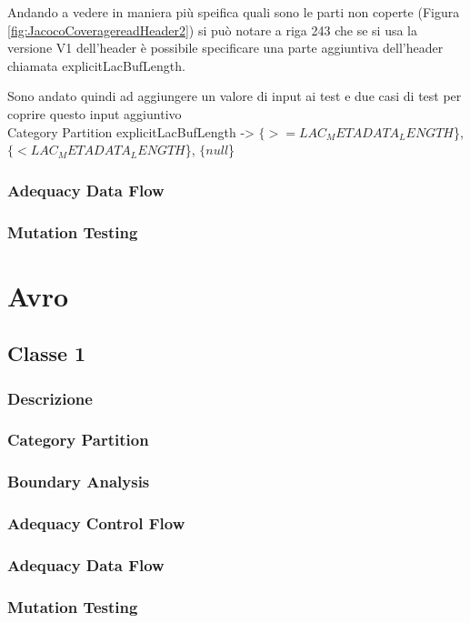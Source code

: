 \documentclass[12pt, a4paper]{article}
\begin{document}
Andando a vedere in maniera più speifica quali sono le parti non coperte (Figura \ref{fig:JacocoCoveragereadHeader2})
si può notare a riga 243 che se si usa la versione V1 dell'header è possibile specificare una parte aggiuntiva dell'header
chiamata explicitLacBufLength.

Sono andato quindi ad aggiungere un valore di input ai test e due casi di test per coprire questo input aggiuntivo \\
Category Partition explicitLacBufLength -> $\{ >= LAC_METADATA_LENGTH $\},$\{ <  LAC_METADATA_LENGTH $\}, $\{ null $\}


\subsubsection{Adequacy Data Flow}
\subsubsection{Mutation Testing}



\section{Avro}
\subsection{Classe 1}
\subsubsection{Descrizione}
\subsubsection{Category Partition}
\subsubsection{Boundary Analysis}
\subsubsection{Adequacy Control Flow}
\subsubsection{Adequacy Data Flow}
\subsubsection{Mutation Testing}
\end{document}
